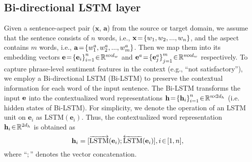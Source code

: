 \documentclass[letterpaper]{article} \usepackage{aaai19}  \usepackage{times}  \usepackage{latexsym}
\begin{document}
\subsection{Bi-directional LSTM layer}
Given a sentence-aspect pair ($\mathbf{x}$, $\mathbf{a}$) from the source or target domain, we assume that the sentence consists of $n$ words, i.e., $\small{\mathbf{x}\!=\!\{w_{1},w_{2},...,w_{n}\}}$, and the aspect contains $m$ words, i.e., $\small{\mathbf{a}\!=\!\{w^{a}_{1},w^{a}_{2},...,w^{a}_{m}\}}$.
Then we map them into its embedding vectors $\small{{ \mathbf{e} }\!=\!{ \{ \mathbf{e}_{ i } \}  }_{ i=1 }^{ n } \!\in\! \mathbb{R}^{n\!\times\! d_{w}}}$ and $\small{{ \mathbf{e}^{a} }\!=\!{ \{ \mathbf{e}^{a}_{ j } \}  }_{ j=1 }^{ m } \!\in\! \mathbb{R}^{m\!\times\! d_{w}}}$ respectively. To capture phrase-level sentiment features in the context (e.g., ``not satisfactory''), we employ a Bi-directional LSTM (Bi-LSTM) to preserve the contextual information for each word of the input sentence. The Bi-LSTM transforms the input $\small{{ \mathbf{e} }}$ into the contextualized word representations $\small{{ \mathbf{h} }\!=\!{ \{ \mathbf{h}_{ i } \}  }_{ i=1 }^{ n } \!\in\! \mathbb{R}^{n\!\times\! 2d_{h}}}$ (i.e. hidden states of Bi-LSTM). For simplicity, we denote the operation of an LSTM unit on ${ \mathbf{e} }_{ i }$ as LSTM$( { \mathbf{e} }_{ i } )$. Thus, the contextualized word representation $\small{{ \mathbf{h} }_{ i }\!\in\!\mathbb{R}^{2d_h}}$ is obtained as
\begin{equation}
{ \mathbf{h} }_{ i }= [ \overrightarrow { { \textmd{LSTM} } } ( { \mathbf{e} }_{ i } ) ;\overleftarrow { \textmd{LSTM} } ( { \mathbf{e} }_{ i } )  ] , i\!\in\! [ 1,n ],
\end{equation}
where ``$;$'' denotes the vector concatenation.
\end{document}
